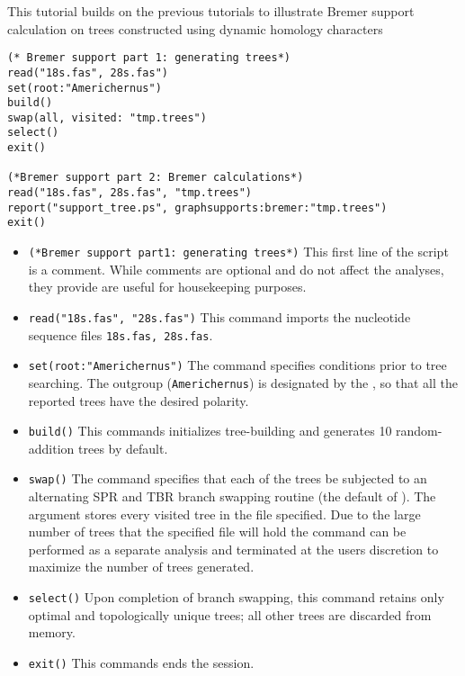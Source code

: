 This tutorial builds on the previous tutorials to illustrate Bremer support 
calculation on trees constructed using dynamic homology characters
    
   \begin{verbatim}
(* Bremer support part 1: generating trees*)
read("18s.fas", 28s.fas")
set(root:"Americhernus")
build()
swap(all, visited: "tmp.trees")
select()
exit()

(*Bremer support part 2: Bremer calculations*)
read("18s.fas", 28s.fas", "tmp.trees")
report("support_tree.ps", graphsupports:bremer:"tmp.trees")
exit()
\end{verbatim}

\begin{itemize}
\item \texttt{(*Bremer support part1: generating trees*)} This first line of the script is a comment. While comments are optional and do not affect the analyses, they provide are useful for housekeeping purposes. 
\item \texttt{read("18s.fas", "28s.fas")} This command imports the nucleotide sequence files \texttt{18s.fas, 28s.fas}.
\item \texttt{set(root:"Americhernus")} The  command specifies conditions prior to tree searching. The outgroup (\texttt{Americhernus}) is designated by the , so that all the reported trees have the desired polarity.     
\item \texttt{build()} This commands initializes tree-building and generates 10 random-addition trees by default.  
\item \texttt{swap()} The  command specifies that each of the trees be subjected to an alternating SPR and TBR branch swapping routine (the default of \poy). The  argument stores every visited tree in the file specified.  Due to the large number of trees that the specified file will hold the   command can be performed as a separate analysis and terminated at the users discretion to maximize the number of trees generated.
\item \texttt{select()} Upon completion of branch swapping, this command retains only optimal and topologically unique trees; all other trees are discarded from memory. 
\item \texttt{exit()} This commands ends the \poy session.


\end{itemize}
